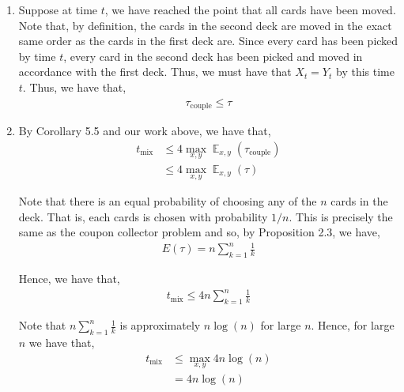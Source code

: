 \documentclass[12pt]{article}
\DeclareMathOperator*{\E}{\mathbb{E}}
\begin{document}
\begin{enumerate}[label=(\Alph*)]

\item Suppose at time $t$, we have reached the point that all cards have been moved. Note that, by definition, the cards in the second deck are moved in the exact same order as the cards in the first deck are. Since every card has been picked by time $t$, every card in the second deck has been picked and moved in accordance with the first deck. Thus, we must have that $X_t = Y_t$ by this time $t$. Thus, we have that,
\begin{align*}
\tau_{\text{couple}} \leq \tau
\end{align*}

\item By Corollary 5.5 and our work above, we have that,
\begin{align*}
t_{\text{mix}} &\leq 4\max_{x,y} \E_{x,y} (\tau_{\text{couple}})\\
&\leq 4\max_{x,y} \E_{x,y} (\tau)
\end{align*}

Note that there is an equal probability of choosing any of the $n$ cards in the deck. That is, each cards is chosen with probability $1/n$. This is precisely the same as the coupon collector problem and so, by Proposition 2.3, we have,
\begin{align*}
E(\tau) = n \sum_{k=1}^n \frac{1}{k}
\end{align*}

Hence, we have that,
\begin{align*}
t_{\text{mix}} \leq 4n \sum_{k=1}^n \frac{1}{k}
\end{align*}

Note that $n \sum_{k=1}^n \frac{1}{k}$ is approximately $n\log(n)$ for large $n$. Hence, for large $n$ we have that,
\begin{align*}
t_{\text{mix}} &\leq \max_{x,y} 4n\log(n)\\
&= 4n\log(n)
\end{align*}
\end{enumerate}
\end{document}
